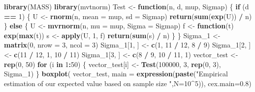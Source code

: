 \documentclass[
]{article}
\newenvironment{Shaded}{\begin{snugshade}}{\end{snugshade}}
\newcommand{\AttributeTok}[1]{\textcolor[rgb]{0.13,0.29,0.53}{#1}}
\newcommand{\ControlFlowTok}[1]{\textcolor[rgb]{0.13,0.29,0.53}{\textbf{#1}}}
\newcommand{\DecValTok}[1]{\textcolor[rgb]{0.00,0.00,0.81}{#1}}
\newcommand{\FloatTok}[1]{\textcolor[rgb]{0.00,0.00,0.81}{#1}}
\newcommand{\FunctionTok}[1]{\textcolor[rgb]{0.13,0.29,0.53}{\textbf{#1}}}
\newcommand{\NormalTok}[1]{#1}
\newcommand{\OtherTok}[1]{\textcolor[rgb]{0.56,0.35,0.01}{#1}}
\newcommand{\SpecialCharTok}[1]{\textcolor[rgb]{0.81,0.36,0.00}{\textbf{#1}}}
\newcommand{\StringTok}[1]{\textcolor[rgb]{0.31,0.60,0.02}{#1}}
\begin{document}
\begin{Shaded}
\begin{Highlighting}[]
\FunctionTok{library}\NormalTok{(MASS)}
\FunctionTok{library}\NormalTok{(mvtnorm)}
\NormalTok{Test }\OtherTok{\textless{}{-}} \ControlFlowTok{function}\NormalTok{(n, d, mup, Sigmap) \{}
  \ControlFlowTok{if}\NormalTok{ (d }\SpecialCharTok{==} \DecValTok{1}\NormalTok{) \{}
\NormalTok{    U }\OtherTok{\textless{}{-}} \FunctionTok{rnorm}\NormalTok{(n, }\AttributeTok{mean =}\NormalTok{ mup, }\AttributeTok{sd =}\NormalTok{ Sigmap)}
    \FunctionTok{return}\NormalTok{(}\FunctionTok{sum}\NormalTok{(}\FunctionTok{exp}\NormalTok{(U)) }\SpecialCharTok{/}\NormalTok{ n)}
\NormalTok{  \} }\ControlFlowTok{else}\NormalTok{ \{}
\NormalTok{    U }\OtherTok{\textless{}{-}} \FunctionTok{mvrnorm}\NormalTok{(n, }\AttributeTok{mu =}\NormalTok{ mup, }\AttributeTok{Sigma =}\NormalTok{ Sigmap)}
\NormalTok{    f }\OtherTok{\textless{}{-}} \ControlFlowTok{function}\NormalTok{(t) }\FunctionTok{exp}\NormalTok{(}\FunctionTok{max}\NormalTok{(t))}
\NormalTok{    s }\OtherTok{\textless{}{-}} \FunctionTok{apply}\NormalTok{(U, }\DecValTok{1}\NormalTok{, f)}
    \FunctionTok{return}\NormalTok{(}\FunctionTok{sum}\NormalTok{(s) }\SpecialCharTok{/}\NormalTok{ n)}
\NormalTok{  \}}
\NormalTok{\}}
\NormalTok{Sigma\_1 }\OtherTok{\textless{}{-}} \FunctionTok{matrix}\NormalTok{(}\DecValTok{0}\NormalTok{, }\AttributeTok{nrow =} \DecValTok{3}\NormalTok{, }\AttributeTok{ncol =} \DecValTok{3}\NormalTok{)}
\NormalTok{Sigma\_1[}\DecValTok{1}\NormalTok{, ] }\OtherTok{\textless{}{-}} \FunctionTok{c}\NormalTok{(}\DecValTok{1}\NormalTok{, }\DecValTok{11} \SpecialCharTok{/} \DecValTok{12}\NormalTok{, }\DecValTok{8} \SpecialCharTok{/} \DecValTok{9}\NormalTok{)}
\NormalTok{Sigma\_1[}\DecValTok{2}\NormalTok{, ] }\OtherTok{\textless{}{-}} \FunctionTok{c}\NormalTok{(}\DecValTok{11} \SpecialCharTok{/} \DecValTok{12}\NormalTok{, }\DecValTok{1}\NormalTok{, }\DecValTok{10} \SpecialCharTok{/} \DecValTok{11}\NormalTok{)}
\NormalTok{Sigma\_1[}\DecValTok{3}\NormalTok{, ] }\OtherTok{\textless{}{-}} \FunctionTok{c}\NormalTok{(}\DecValTok{8} \SpecialCharTok{/} \DecValTok{9}\NormalTok{, }\DecValTok{10} \SpecialCharTok{/} \DecValTok{11}\NormalTok{, }\DecValTok{1}\NormalTok{)}
\NormalTok{vector\_test }\OtherTok{\textless{}{-}} \FunctionTok{rep}\NormalTok{(}\DecValTok{0}\NormalTok{, }\DecValTok{50}\NormalTok{)}
\ControlFlowTok{for}\NormalTok{ (i }\ControlFlowTok{in} \DecValTok{1}\SpecialCharTok{:}\DecValTok{50}\NormalTok{) \{}
\NormalTok{  vector\_test[i] }\OtherTok{\textless{}{-}} \FunctionTok{Test}\NormalTok{(}\DecValTok{100000}\NormalTok{, }\DecValTok{3}\NormalTok{, }\FunctionTok{rep}\NormalTok{(}\DecValTok{0}\NormalTok{, }\DecValTok{3}\NormalTok{), Sigma\_1)}
\NormalTok{\}}
\FunctionTok{boxplot}\NormalTok{(  vector\_test,  }\AttributeTok{main =} \FunctionTok{expression}\NormalTok{(}\FunctionTok{paste}\NormalTok{(}\StringTok{"Empirical estimation of our expected value based on sample size "}\NormalTok{,}\AttributeTok{N=}\DecValTok{10}\SpecialCharTok{\^{}}\DecValTok{5}\NormalTok{)),    }\AttributeTok{cex.main=}\FloatTok{0.8}\NormalTok{)}
\end{Highlighting}
\end{Shaded}
\end{document}
